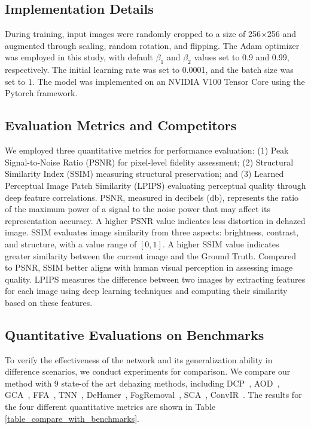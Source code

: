 \documentclass[journal]{IEEEtran}
\begin{document}
\subsection{Implementation Details}
During training, input images were randomly cropped to a size of 256×256 and augmented through scaling, random rotation, and flipping. The Adam optimizer~\cite{kingma2014adam} was employed in this study, with default $\beta_{1}$ and $\beta_{2}$ values set to 0.9 and 0.99, respectively. The initial learning rate was set to 0.0001, and the batch size was set to 1. The model was implemented on an NVIDIA V100 Tensor Core using the Pytorch framework.

\subsection{Evaluation Metrics and Competitors}
We employed three quantitative metrics for performance evaluation: (1) Peak Signal-to-Noise Ratio (PSNR) for pixel-level fidelity assessment; (2) Structural Similarity Index (SSIM)\cite{wang2004image} measuring structural preservation; and (3) Learned Perceptual Image Patch Similarity (LPIPS)\cite{zhang2018unreasonable} evaluating perceptual quality through deep feature correlations. PSNR, measured in decibels (db), represents the ratio of the maximum power of a signal to the noise power that may affect its representation accuracy. A higher PSNR value indicates less distortion in dehazed image. SSIM evaluates image similarity from three aspects: brightness, contrast, and structure, with a value range of $[0,1]$. A higher SSIM value indicates greater similarity between the current image and the Ground Truth. Compared to PSNR, SSIM better aligns with human visual perception in assessing image quality. LPIPS measures the difference between two images by extracting features for each image using deep learning techniques and computing their similarity based on these features.

\subsection{Quantitative Evaluations on Benchmarks}
To verify the effectiveness of the network and its generalization ability in difference scenarios, we conduct experiments for comparison. We compare our method with 9 state-of the art dehazing methods, including DCP~\cite{he2010single}, AOD~\cite{li2017aod}, GCA~\cite{chen2019gated}, FFA~\cite{qin2020ffa}, TNN~\cite{yu2021two}, DeHamer~\cite{guo2022image}, FogRemoval~\cite{jin2022structure}, SCA~\cite{guo2023scanet}, ConvIR~\cite{cui2024revitalizing}. The results for the four different quantitative metrics are shown in Table \ref{table_compare_with_benchmarks}.
\end{document}

